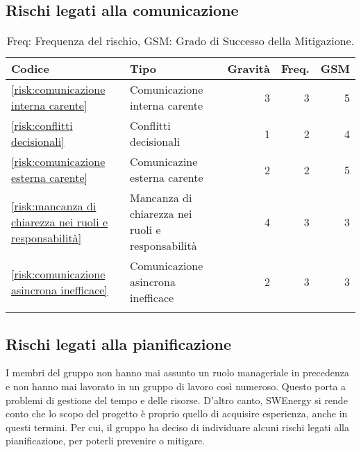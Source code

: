\subsection{Rischi legati alla comunicazione}
\begin{table}[H]
	\centering
	\begin{tabular}{l|l|r|r|r}
		\hline
		\textbf{Codice}                                                          & \textbf{Tipo} & \textbf{Gravità} & \textbf{Freq.} & \textbf{GSM} \\
		\hline
		\autoref{risk:comunicazione interna carente} 			&Comunicazione interna carente           & 3                & 3                  & 5                        \\
		\autoref{risk:conflitti decisionali} 					&Conflitti decisionali                           & 1                & 2                  & 4                        \\
		\autoref{risk:comunicazione esterna carente} 			&Comunicazine esterna carente            & 2                & 2                  & 5                        \\
		\autoref{risk:mancanza di chiarezza nei ruoli e responsabilità} &Mancanza di chiarezza nei ruoli e responsabilità									 & 4                & 3                  & 3                        \\
		\autoref{risk:comunicazione asincrona inefficace} &Comunicazione asincrona inefficace		& 2                & 3                  & 3                        \\
		\hline
		\multicolumn{5}{l}{}                                                                                                                                    \\
	\end{tabular}
	\caption{Freq: Frequenza del rischio, GSM: Grado di Successo della Mitigazione.}
\end{table}






\subsection{Rischi legati alla pianificazione}

I membri del gruppo non hanno mai assunto un ruolo manageriale in
precedenza e non hanno mai lavorato in un gruppo di lavoro così
numeroso. Questo porta a problemi di gestione del tempo e delle
risorse. D'altro canto, SWEnergy si rende conto che lo scopo del
progetto è proprio quello di acquisire esperienza, anche in questi
termini. Per cui, il gruppo ha deciso di individuare alcuni
rischi legati alla pianificazione, per poterli prevenire o mitigare.


